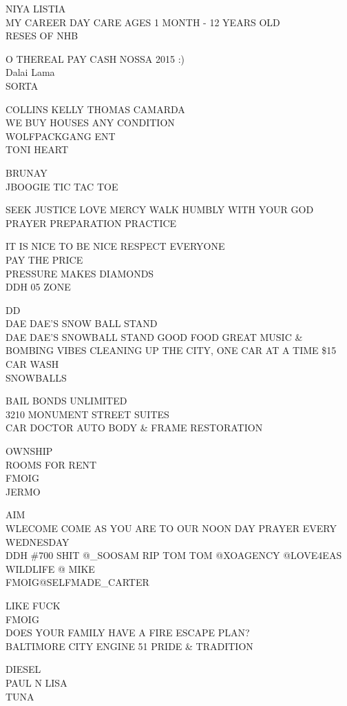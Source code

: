 \documentclass[10pt,letterpaper]{article}
\begin{document}
NIYA LISTIA\\
MY CAREER DAY CARE AGES 1 MONTH {-} 12 YEARS OLD\\
RESES OF NHB

O THEREAL PAY CASH NOSSA 2015 :)\\
Dalai Lama\\
SORTA

COLLINS KELLY THOMAS CAMARDA\\
WE BUY HOUSES ANY CONDITION\\
WOLFPACKGANG ENT\\
TONI HEART

BRUNAY\\
JBOOGIE TIC TAC TOE

SEEK JUSTICE LOVE MERCY WALK HUMBLY WITH YOUR GOD\\
PRAYER PREPARATION PRACTICE

IT IS NICE TO BE NICE RESPECT EVERYONE\\
PAY THE PRICE\\
PRESSURE MAKES DIAMONDS\\
DDH 05 ZONE

DD\\
DAE DAE'S SNOW BALL STAND\\
DAE DAE'S SNOWBALL STAND GOOD FOOD GREAT MUSIC \& BOMBING VIBES CLEANING UP THE CITY, ONE CAR AT A TIME \$15 CAR WASH\\
SNOWBALLS

BAIL BONDS UNLIMITED\\
3210 MONUMENT STREET SUITES\\
CAR DOCTOR AUTO BODY \& FRAME RESTORATION

OWNSHIP\\
ROOMS FOR RENT\\
FMOIG\\
JERMO

AIM\\
WLECOME COME AS YOU ARE TO OUR NOON DAY PRAYER EVERY WEDNESDAY\\
DDH \#700 SHIT @\_SOOSAM RIP TOM TOM @XOAGENCY @LOVE4EAS WILDLIFE @ MIKE\\
FMOIG@SELFMADE\_CARTER

LIKE FUCK\\
FMOIG\\
DOES YOUR FAMILY HAVE A FIRE ESCAPE PLAN?\\
BALTIMORE CITY ENGINE 51 PRIDE \& TRADITION

DIESEL\\
PAUL N LISA\\
TUNA
\end{document}
